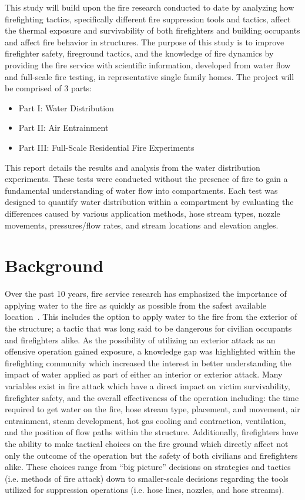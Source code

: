 \documentclass[12pt,oneside]{book}
\begin{document}
This study will build upon the fire research conducted to date by analyzing how firefighting tactics, specifically different fire suppression tools and tactics, affect the thermal exposure and survivability of both firefighters and building occupants and affect fire behavior in structures. The purpose of this study is to improve firefighter safety, fireground tactics, and the knowledge of fire dynamics by providing the fire service with scientific information, developed from water flow and full-scale fire testing, in representative single family homes. The project will be comprised of 3 parts:

\begin{itemize}
	\setlength{\itemindent}{0.25in}
	\item Part I:  Water Distribution
	\item Part II: Air Entrainment
	\item Part III: Full-Scale Residential Fire Experiments
	\end{itemize}

This report details the results and analysis from the water distribution experiments. These tests were conducted without the presence of fire to gain a fundamental understanding of water flow into compartments. Each test was designed to quantify water distribution within a compartment by evaluating the differences caused by various application methods, hose stream types, nozzle movements, pressures/flow rates, and stream locations and elevation angles. 


\chapter{Background}

Over the past 10 years, fire service research has emphasized the importance of applying water to the fire as quickly as possible from the safest available location~\cite{DHS2008,DHS2010}. This includes the option to apply water to the fire from the exterior of the structure; a tactic that was long said to be dangerous for civilian occupants and firefighters alike. As the possibility of utilizing an exterior attack as an offensive operation gained exposure, a knowledge gap was highlighted within the firefighting community which increased the interest in better understanding the impact of water applied as part of either an interior or exterior attack. Many variables exist in fire attack which have a direct impact on victim survivability, firefighter safety, and the overall effectiveness of the operation including: the time required to get water on the fire, hose stream type, placement, and movement, air entrainment, steam development, hot gas cooling and contraction, ventilation, and the position of flow paths within the structure. Additionally, firefighters have the ability to make tactical choices on the fire ground which directly affect not only the outcome of the operation but the safety of both civilians and firefighters alike. These choices range from ``big picture'' decisions on strategies and tactics (i.e. methods of fire attack) down to smaller-scale decisions regarding the tools utilized for suppression operations (i.e. hose lines, nozzles, and hose streams). 
\end{document}
